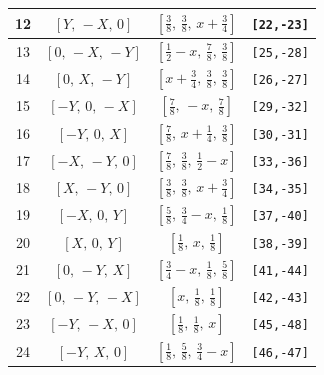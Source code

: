 \documentclass[fleqn,8pt]{jsarticle}
\begin{document}
\begin{longtable}{cccc}
12 & $\left[ Y,\, - X,\, 0 \right]$ & $\left[ \frac{3}{8},\, \frac{3}{8},\, x + \frac{3}{4} \right]$ & {\tt [22,-23]} \\ \hline
13 & $\left[ 0,\, - X,\, - Y \right]$ & $\left[ \frac{1}{2} - x,\, \frac{7}{8},\, \frac{3}{8} \right]$ & {\tt [25,-28]} \\ \hline
14 & $\left[ 0,\, X,\, - Y \right]$ & $\left[ x + \frac{3}{4},\, \frac{3}{8},\, \frac{3}{8} \right]$ & {\tt [26,-27]} \\ \hline
15 & $\left[ - Y,\, 0,\, - X \right]$ & $\left[ \frac{7}{8},\, - x,\, \frac{7}{8} \right]$ & {\tt [29,-32]} \\ \hline
16 & $\left[ - Y,\, 0,\, X \right]$ & $\left[ \frac{7}{8},\, x + \frac{1}{4},\, \frac{3}{8} \right]$ & {\tt [30,-31]} \\ \hline
17 & $\left[ - X,\, - Y,\, 0 \right]$ & $\left[ \frac{7}{8},\, \frac{3}{8},\, \frac{1}{2} - x \right]$ & {\tt [33,-36]} \\ \hline
18 & $\left[ X,\, - Y,\, 0 \right]$ & $\left[ \frac{3}{8},\, \frac{3}{8},\, x + \frac{3}{4} \right]$ & {\tt [34,-35]} \\ \hline
19 & $\left[ - X,\, 0,\, Y \right]$ & $\left[ \frac{5}{8},\, \frac{3}{4} - x,\, \frac{1}{8} \right]$ & {\tt [37,-40]} \\ \hline
20 & $\left[ X,\, 0,\, Y \right]$ & $\left[ \frac{1}{8},\, x,\, \frac{1}{8} \right]$ & {\tt [38,-39]} \\ \hline
21 & $\left[ 0,\, - Y,\, X \right]$ & $\left[ \frac{3}{4} - x,\, \frac{1}{8},\, \frac{5}{8} \right]$ & {\tt [41,-44]} \\ \hline
22 & $\left[ 0,\, - Y,\, - X \right]$ & $\left[ x,\, \frac{1}{8},\, \frac{1}{8} \right]$ & {\tt [42,-43]} \\ \hline
23 & $\left[ - Y,\, - X,\, 0 \right]$ & $\left[ \frac{1}{8},\, \frac{1}{8},\, x \right]$ & {\tt [45,-48]} \\ \hline
24 & $\left[ - Y,\, X,\, 0 \right]$ & $\left[ \frac{1}{8},\, \frac{5}{8},\, \frac{3}{4} - x \right]$ & {\tt [46,-47]} \\
\end{longtable}
\renewcommand{\arraystretch}{1.2}
\end{document}
